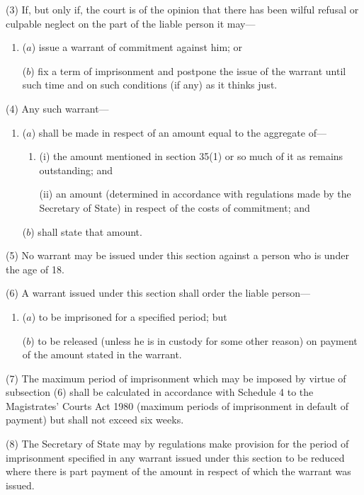 \documentclass[12pt,a4paper]{article}
\begin{document}
(3) If, but only if, the court is of the opinion that there has been wilful refusal or culpable neglect on the part of the liable person it may—
\begin{enumerate}\item[]
($a$) issue a warrant of commitment against him; or

($b$) fix a term of imprisonment and postpone the issue of the warrant until such time and on such conditions (if any) as it thinks just.
\end{enumerate}

(4) Any such warrant—
\begin{enumerate}\item[]
($a$) shall be made in respect of an amount equal to the aggregate of—
\begin{enumerate}\item[]
(i) the amount mentioned in section 35(1)  or so much of it as remains outstanding; and


(ii) an amount (determined in accordance with regulations made by the Secretary of State) in respect of the costs of commitment; and
\end{enumerate}

($b$) shall state that amount.
\end{enumerate}

(5) No warrant may be issued under this section against a person who is under the age of 18.

(6) A warrant issued under this section shall order the liable person—
\begin{enumerate}\item[]
($a$) to be imprisoned for a specified period; but

($b$) to be released (unless he is in custody for some other reason) on payment of the amount stated in the warrant.
\end{enumerate}

(7) The maximum period of imprisonment which may be imposed by virtue of subsection (6)  shall be calculated in accordance with Schedule 4 to the Magistrates' Courts Act 1980 (maximum periods of imprisonment in default of payment) but shall not exceed six weeks.

(8) The Secretary of State may by regulations make provision for the period of imprisonment specified in any warrant issued under this section to be reduced where there is part payment of the amount in respect of which the warrant was issued.
\end{document}
